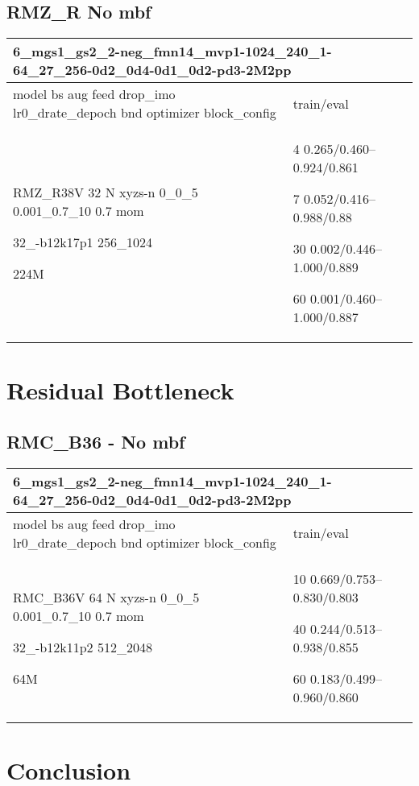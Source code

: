 \documentclass[,table,dvipsnames]{article}
\begin{document}
\subsection{RMZ\_R No mbf}
\noindent\begin{tabular}{|p{10cm}|p{5cm}| }	
	\hline
	\multicolumn{2}{|p{15cm}|}{ 6\_mgs1\_gs2\_2-neg\_fmn14\_mvp1-1024\_240\_1-64\_27\_256-0d2\_0d4-0d1\_0d2-pd3-2M2pp}\\
	\hline
	model bs aug feed drop\_imo lr0\_drate\_depoch bnd optimizer block\_config & train/eval \\
	
	\rowcolor{red!20}
	RMZ\_R38V 32 N xyzs-n 0\_0\_5 0.001\_0.7\_10 0.7 mom \par 32\_-b12k17p1 256\_1024\par 224M& 4 0.265/0.460--0.924/0.861\par 7 0.052/0.416--0.988/0.88\par 30 0.002/0.446--1.000/0.889\par 60 0.001/0.460--1.000/0.887\\
	\hline 
\end{tabular}


\section{Residual Bottleneck}
\subsection{RMC\_B36 - No mbf}
\noindent\begin{tabular}{|p{10cm}|p{5cm}| }	
	\hline
	\multicolumn{2}{|p{15cm}|}{ 6\_mgs1\_gs2\_2-neg\_fmn14\_mvp1-1024\_240\_1-64\_27\_256-0d2\_0d4-0d1\_0d2-pd3-2M2pp }\\
	\hline
	model bs aug feed drop\_imo lr0\_drate\_depoch bnd optimizer block\_config & train/eval \\
	
	\rowcolor{red!20}
	RMC\_B36V 64 N xyzs-n 0\_0\_5 0.001\_0.7\_10 0.7 mom\par 32\_-b12k11p2 512\_2048\par 64M&10 0.669/0.753--0.830/0.803\par40 0.244/0.513--0.938/0.855\par 60 0.183/0.499--0.960/0.860\\
	
	\hline 
\end{tabular}

\section{Conclusion}
\end{document}
